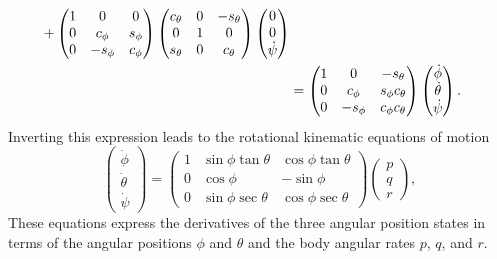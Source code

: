 {\begin{align}
+ \begin{pmatrix}
    1 & 0 & 0 \\
    0 & c_{\phi} & s_{\phi} \\
    0 & -s_{\phi} & c_{\phi}
  \end{pmatrix}
  \begin{pmatrix}
    c_{\theta} & 0 & -s_{\theta} \\
    0 & 1 & 0 \\
    s_{\theta} & 0 & c_{\theta}
  \end{pmatrix}
  \begin{pmatrix} 0 \\ 0 \\ \dot{\psi} \end{pmatrix}  \notag \\
&= \begin{pmatrix}
  1 & 0 & -s_{\theta} \\
  0 & c_{\phi} & s_{\phi} c_{\theta} \\
  0 & -s_{\phi} & c_{\phi} c_{\theta}
\end{pmatrix}
\begin{pmatrix} \dot{\phi} \\ \dot{\theta} \\ \dot{\psi} \end{pmatrix}.
\label{eq:kin-phithetapsidot-to-pqr}
\end{align}
Inverting this expression leads to the rotational kinematic equations of motion
\begin{equation} \label{eq:kin-rotational-kinematics}
\begin{pmatrix} \dot{\phi} \\ \dot{\theta} \\ \dot{\psi} \end{pmatrix}
= \begin{pmatrix}
  1 & \sin\phi\tan\theta & \cos\phi\tan\theta \\
  0 & \cos\phi & -\sin\phi \\
  0 & \sin\phi\sec\theta & \cos\phi\sec\theta
  \end{pmatrix}
  \begin{pmatrix} p \\ q \\ r \end{pmatrix} ,
\end{equation}
%
These equations express the derivatives of the three angular position states in terms of
the angular positions $\phi$ and $\theta$ and the body angular rates $p$, $q$, and $r$.

}
